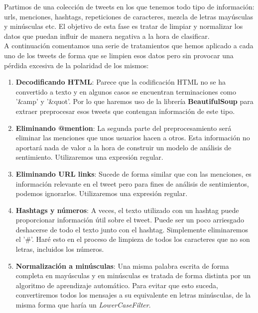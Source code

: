 \documentclass[a4paper,12pt]{report}
\begin{document}
{\setlength{\parindent}{0cm}
Partimos de una colección de tweets en los que tenemos todo tipo de información: urls, menciones, hashtags, repeticiones de caracteres, mezcla de letras mayúsculas y minúsculas etc. El objetivo de esta fase es tratar de limpiar y normalizar los datos que puedan influir de manera negativa a la hora de clasificar. }
\vspace{2mm}\\
A continuación comentamos una serie de tratamientos que hemos aplicado a cada uno de los tweets de forma que se limpien esos datos pero sin provocar una pérdida excesiva de la polaridad de los mismos:

\begin{enumerate}

\item \textbf{Decodificando HTML}: Parece que la codificación HTML no se ha convertido a texto y en algunos casos se encuentran terminaciones como '\&amp' y '\&quot'. Por lo que haremos uso de la librería \textbf{BeautifulSoup} para extraer preprocesar esos tweets que contengan información de este tipo.

\item \textbf{Eliminando @mention}: La segunda parte del preprocesamiento será eliminar las menciones que unos usuarios hacen a otros. Esta información no aportará nada de valor a la hora de construir un modelo de análisis de sentimiento. Utilizaremos una expresión regular. 

\item \textbf{Eliminando URL links}: Sucede de forma similar que con las menciones, es información relevante en el tweet pero para fines de análisis de sentimientos, podemos ignorarlos. Utilizaremos una expresión regular.

\item \textbf{Hashtags y números}: A veces, el texto utilizado con un hashtag puede proporcionar información útil sobre el tweet. Puede ser un poco arriesgado deshacerse de todo el texto junto con el hashtag. Simplemente eliminaremos el '\#'. Haré esto en el proceso de limpieza de todos los caracteres que no son letras, incluidos los números. 

\item \textbf{Normalización a minúsculas}: Una misma palabra escrita de forma completa en mayúsculas y en minúsculas es tratada de forma distinta por un algoritmo de aprendizaje automático. Para evitar que esto suceda, convertiremos todos los mensajes a su equivalente en letras minúsculas, de la misma forma que haría un \textit{LowerCaseFilter}.

\end{enumerate}
\end{document}
